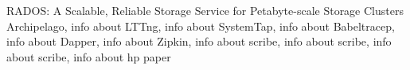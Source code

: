 \documentclass[a4paper,10pt,twocolumn]{article}
\begin{document}
\begin{thebibliography}{9}
    RADOS: A Scalable, Reliable Storage Service for Petabyte-scale
    Storage Clusters
    Archipelago,
    info about
    LTTng,
    info about
    SystemTap,
    info about
    Babeltracep,
    info about
    Dapper,
    info about
    Zipkin,
   info about
    scribe,
   info about
    scribe,
   info about
    scribe,
   info about
    hp paper
\end{thebibliography}
\end{document}

